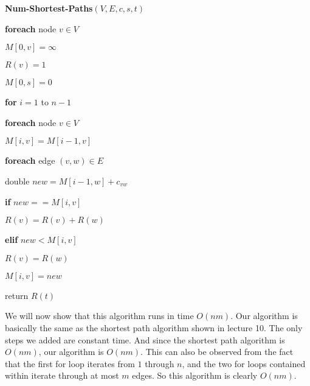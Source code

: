 \documentclass{article}
\begin{document}
\vspace{5mm}
\noindent \textbf{Num-Shortest-Paths}$(V, E, c, s, t)$
\begin{enumerate}
    \item \textbf{foreach} node $v \in V$
    {\setlength\itemindent{25pt} \item $M[0,v] = \infty$ }
    {\setlength\itemindent{25pt} \item $R(v) = 1$ }
    \item $M[0,s] = 0$
    {\setlength\itemindent{25pt} \item \textbf{for} $i=1$ to $n-1$ }
    {\setlength\itemindent{50pt} \item \textbf{foreach} node $v \in V$ }
    {\setlength\itemindent{75pt} \item $M[i,v] = M[i-1,v]$ }
    {\setlength\itemindent{75pt} \item \textbf{foreach} edge $(v,w) \in E$ }
    {\setlength\itemindent{100pt} \item double $new = M[i-1,w] + c_{vw}$ }
    {\setlength\itemindent{100pt} \item \textbf{if} $new == M[i,v]$ }
    {\setlength\itemindent{125pt} \item $R(v) = R(v) + R(w)$ }
    {\setlength\itemindent{100pt} \item \textbf{elif} $new < M[i,v]$ }
    {\setlength\itemindent{125pt} \item $R(v) = R(w)$ }
    {\setlength\itemindent{125pt} \item $M[i,v] = new$ }
    \item return $R(t)$
\end{enumerate}
    We will now show that this algorithm runs in time $O(nm)$. Our algorithm is
    basically the same as the shortest path algorithm shown in lecture 10.
    The only steps we added are constant
    time. And since the shortest path algorithm is $O(nm)$, our algorithm is
    $O(nm)$. This can also be observed from the fact that the first for loop
    iterates from $1$ through $n$, and the two for loops contained within iterate
    through at most $m$ edges. So this algorithm is clearly $O(nm)$.
\end{document}
